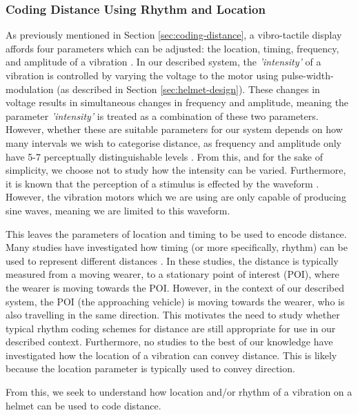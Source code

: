\documentclass{interim}
\begin{document}
\subsubsection{Coding Distance Using Rhythm and Location}
As previously mentioned in Section \ref{sec:coding-distance}, a vibro-tactile display affords four parameters which can be adjusted: the location, timing, frequency, and amplitude of a vibration \cite{guidelines}. In our described system, the \textit{'intensity'} of a vibration is controlled by varying the voltage to the motor using pulse-width-modulation (as described in Section \ref{sec:helmet-design}). These changes in voltage results in simultaneous changes in frequency and amplitude, meaning the parameter \textit{'intensity'} is treated as a combination of these two parameters. However, whether these are suitable parameters for our system depends on how many intervals we wish to categorise distance, as frequency and amplitude only have 5-7 perceptually distinguishable levels \cite{guidelines}. From this, and for the sake of simplicity, we choose not to study how the intensity can be varied. Furthermore, it is known that the perception of a stimulus is effected by the waveform \cite{guidelines}. However, the vibration motors which we are using are only capable of producing sine waves, meaning we are limited to this waveform.

This leaves the parameters of location and timing to be used to encode distance. Many studies have investigated how timing (or more specifically, rhythm) can be used to represent different distances \cite{10.1145/1060581.1060585, 5326374, 10.1145/1520340.1520718, 10.1145/1753326.1753581, 10.1145/1868914.1868923}. In these studies, the distance is typically measured from a moving wearer, to a stationary point of interest (POI), where the wearer is moving towards the POI. However, in the context of our described system, the POI (the approaching vehicle) is moving towards the wearer, who is also travelling in the same direction. This motivates the need to study whether typical rhythm coding schemes for distance are still appropriate for use in our described context. Furthermore, no studies to the best of our knowledge have investigated how the location of a vibration can convey distance. This is likely because the location parameter is typically used to convey direction.

From this, we seek to understand how location and/or rhythm of a vibration on a helmet can be used to code distance.
\end{document}
